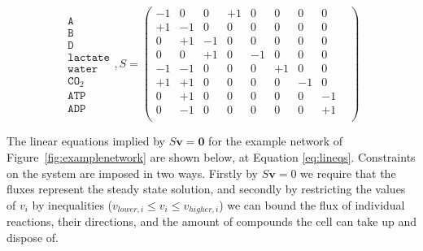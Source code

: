 \documentclass[a4paper,12pt]{article}
\begin{document}
	\begin{equation}
	\begin{matrix}
		\texttt{A}  \\
		\texttt{B}\\
		\texttt{D}\\
		\texttt{lactate}\\
		\texttt{water}\\
		\texttt{CO}_2\\
		\texttt{ATP}\\
		\texttt{ADP}
	\end{matrix}
	,S=
	\begin{pmatrix}
			 -1 & 0 & 0 & +1 & 0 & 0 & 0 & 0 & \\ 
			 +1 & -1 & 0 & 0 & 0 & 0 & 0 &0 & \\ 
			 0 & +1 & -1 & 0 & 0 & 0 & 0 & 0 & \\ 
			 0 & 0 & +1 & 0 & -1 & 0 & 0 & 0 & \\ 
			 -1 & -1 & 0 & 0 & 0 &+1 & 0 & 0 & \\ 
			 +1 & +1 & 0 & 0 & 0 & 0 & -1&0 & \\ 
			 0 & +1 & 0 & 0 & 0 & 0 &0 & -1 &\\ 
			 0 & -1 & 0 & 0 & 0 & 0 &0 & +1 & \\ 
			 
		\end{pmatrix} 
		\label{eq:examplematrix}
	\end{equation}


	The linear equations implied by $S\mathbf{v}=\mathbf{0}$ for the example network of Figure~\ref{fig:examplenetwork} are shown below, at Equation \ref{eq:lineqs}. Constraints on the system are imposed in two ways. Firstly by $S\mathbf{v}=0$ we require that the fluxes represent the steady state solution, and secondly by restricting the values of $v_i$ by inequalities ($v_{lower,i}\leq v_i \leq v_{higher,i}$) we can bound the flux of individual reactions, their directions, and the amount of compounds the cell can take up and dispose of. 
	
\end{document}
